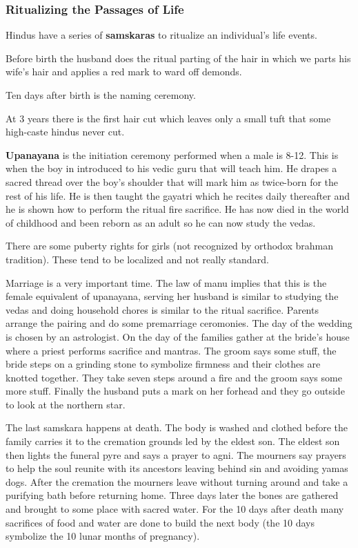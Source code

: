 \documentclass{article}
\begin{document}
\subsubsection*{Ritualizing the Passages of Life}
\label{ssub:ritualizing_the_passages_of_life}
Hindus have a series of \textbf{samskaras} to ritualize an individual's life events.

Before birth the husband does the ritual parting of the hair in which we parts his wife's hair and applies a red mark to ward off demonds.

Ten days after birth is the naming ceremony.

At 3 years there is the first hair cut which leaves only a small tuft that some high-caste hindus never cut.

\textbf{Upanayana} is the initiation ceremony performed when a male is 8-12. This is when the boy in introduced to his vedic guru that will teach him. He drapes a sacred thread over the boy's shoulder that will mark him as twice-born for the rest of his life. He is then taught the gayatri which he recites daily thereafter and he is shown how to perform the ritual fire sacrifice. He has now died in the world of childhood and been reborn as an adult so he can now study the vedas.

There are some puberty rights for girls (not recognized by orthodox brahman tradition). These tend to be localized and not really standard.

Marriage is a very important time. The law of manu implies that this is the female equivalent of upanayana, serving her husband is similar to studying the vedas and doing household chores is similar to the ritual sacrifice. Parents arrange the pairing and do some premarriage ceromonies. The day of the wedding is chosen by an astrologist. On the day of the families gather at the bride's house where a priest performs sacrifice and mantras. The groom says some stuff, the bride steps on a grinding stone to symbolize firmness and their clothes are knotted together. They take seven steps around a fire and the groom says some more stuff. Finally the husband puts a mark on her forhead and they go outside to look at the northern star.

The last samskara happens at death. The body is washed and clothed before the family carries it to the cremation grounds led by the eldest son. The eldest son then lights the funeral pyre and says a prayer to agni. The mourners say prayers to help the soul reunite with its ancestors leaving behind sin and avoiding yamas dogs. After the cremation the mourners leave without turning around and take a purifying bath before returning home.  Three days later the bones are gathered and brought to some place with sacred water. For the 10 days after death many sacrifices of food and water are done to build the next body (the 10 days symbolize the 10 lunar months of pregnancy).
\end{document}
